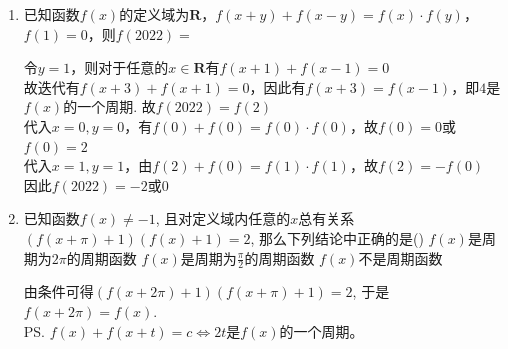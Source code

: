 \begin{enumerate}
\begin{enumerate}
        \begin{jieda}
            $f(x) = -f(\pi - x)$即$f(x)$关于$(\frac{\pi}{2}, 0)$中心对称，又因为$f(x)$是偶函数，所以$2\pi$是$f(x)$的一个周期. 因为定义域为$\mathbf{R}$，所以$f(\frac{k\pi}{2}) = 0, k \in \mathbf{Z}$；结合图像可知有9个零点 \\
        \ps 两个横坐标不同位置的对称性会产生周期性
        \begin{enumerate}
            \item 两个对称轴的横坐标之差的二倍是函数的周期：$f(x) = f(2a-x), f(x) = f(2b - x) \Leftrightarrow 2|a-b|$是$f(x)$的一个周期。
            \item 两个纵坐标相同的对称中心的横坐标之差的二倍是函数的周期：$f(x) + f(2a-x) = 2m, f(x) + f(2b - x) = 2m \Leftrightarrow 2|a-b|$是$f(x)$的一个周期。
            \item 一个对称轴和一个对称中心的横坐标之差的四倍是函数的周期：$f(x) = f(2a-x), f(x) + f(2b - x) = 2m \Leftrightarrow 4|a-b|$是$f(x)$的一个周期。
        \end{enumerate}
        \end{jieda}
        \item 已知函数$f(x)$的定义域为$\mathbf{R}$，$f(x+y)+f(x-y) = f(x) \cdot f(y)$，$f(1) = 0$，则$f(2022) = $
        \begin{jieda}
            令$y = 1$，则对于任意的$x \in \mathbf{R}$有$f(x+1) + f(x-1) = 0$ \\ 故迭代有$f(x+3) + f(x+1) = 0$，因此有$f(x + 3) = f(x-1)$，即$4$是$f(x)$的一个周期. 故$f(2022) = f(2)$\\
            代入$x = 0, y = 0$，有$f(0) + f(0) = f(0) \cdot f(0)$，故$f(0) = 0$或$f(0) = 2$ \\
            代入$x = 1, y = 1$，由$f(2) + f(0) = f(1) \cdot f(1)$，故$f(2) = -f(0)$ \\
            因此$f(2022) = -2 \mbox{或} 0$
        \end{jieda}
        \item 已知函数$f(x)\neq -1$, 且对定义域内任意的$x$总有关系$(f(x+\pi)+1)(f(x)+1)=2$, 那么下列结论中正确的是\dotfill()
        {$f(x)$是周期为$2\pi$的周期函数}
        {$f(x)$是周期为$\frac{\pi}{2}$的周期函数}
        {$f(x)$不是周期函数}
        \begin{jieda}
        由条件可得$(f(x+2\pi)+1)(f(x+\pi)+1)=2$, 于是$f(x+2\pi)=f(x)$. \\
        \ps $f(x) + f(x+t) = c\Leftrightarrow 2t$是$f(x)$的一个周期。\\

\end{jieda}
\end{enumerate}
\end{enumerate}
